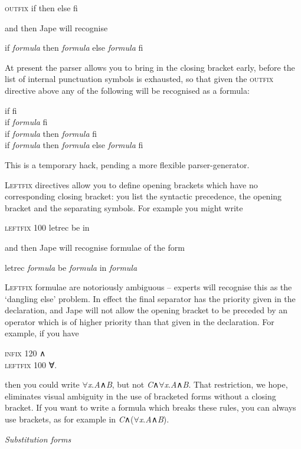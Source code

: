 \documentclass[11pt]{book}
\begin{document}
\textsc{outfix} if then else fi


and then Jape will recognise


if \textit{formula} then \textit{formula} else \textit{formula} fi


At present the parser allows you to bring in the closing bracket early, before the list of internal punctuation symbols is exhausted, so that given the \textsc{outfix} directive above any of the following will be recognised as a formula:

if fi\\
if \textit{formula} fi\\
if \textit{formula} then \textit{formula} fi\\
if \textit{formula} then \textit{formula} else \textit{formula} fi


This is a temporary hack, pending a more flexible parser-generator.


\textsc{Leftfix} directives allow you to define opening brackets which have no corresponding closing bracket: you list the syntactic precedence, the opening bracket and the separating symbols. For example you might write


\textsc{leftfix 100} letrec be in


and then Jape will recognise formulae of the form


letrec \textit{formula} be \textit{formula} in \textit{formula}


\textsc{Leftfix} formulae are notoriously ambiguous -- experts will recognise this as the `dangling else' problem. In effect the final separator has the priority given in the declaration, and Jape will not allow the opening bracket to be preceded by an operator which is of higher priority than that given in the declaration. For example, if you have

\textsc{infix 120} \textsc{∧}\\
\textsc{leftfix 100} ∀.


then you could write \ensuremath{\forall}\textit{x}.\textit{A}\textsc{∧}\textit{B}, but not \textit{C}\textsc{∧}\ensuremath{\forall}\textit{x}.\textit{A}\textsc{∧}\textit{B}. That restriction, we hope, eliminates visual ambiguity in the use of bracketed forms without a closing bracket. If you want to write a formula which breaks these rules, you can always use brackets, as for example in \textit{C}\textsc{∧}(\ensuremath{\forall}\textit{x}.\textit{A}\textsc{∧}\textit{B}).


\textit{Substitution forms}
\end{document}
